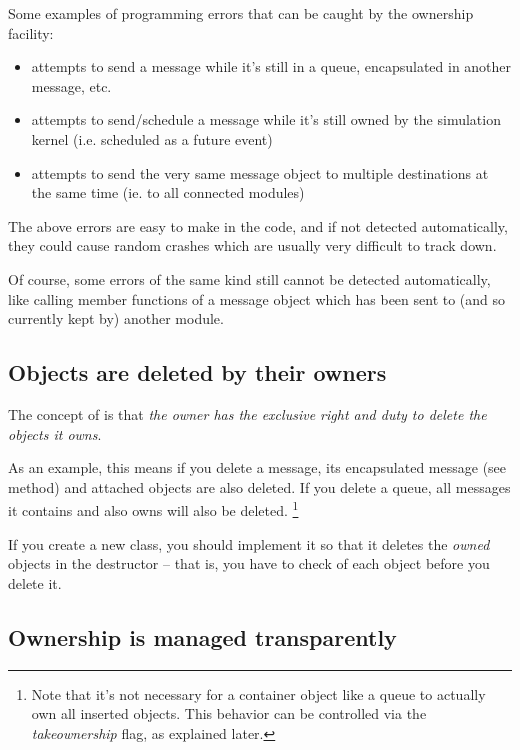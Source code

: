 Some examples of programming errors that can be caught
by the ownership facility:

\begin{itemize}
    \item{attempts to send a message while it's still in a queue,
    encapsulated in another message, etc.}

    \item{attempts to send/schedule a message while it's still owned
    by the simulation kernel (i.e. scheduled as a future event)}

    \item{attempts to send the very same message object to multiple
    destinations at the same time (ie. to all connected modules)}
\end{itemize}

The above errors are easy to make in the code, and if not
detected automatically, they could cause random crashes
which are usually very difficult to track down.

Of course, some errors of the same kind still cannot be detected
automatically, like calling member functions of a message object
which has been sent to (and so currently kept by) another module.


\subsection{Objects are deleted by their owners}

The concept of  is that \textit{the owner has the
exclusive right and duty to delete the objects it owns}.

As an example, this means if you delete a message, its encapsulated
message (see  method) and attached
 objects are also deleted. If you delete a queue,
all messages it contains and also owns will also be deleted.
  \footnote{Note that it's not necessary for a container object like
  a queue to actually own all inserted objects. This behavior
  can be controlled via the \textit{takeownership} flag,
  as explained later.}

If you create a new class, you should implement it so that
it deletes the \textit{owned} objects in the destructor --
that is, you have to check  of each object
before you delete it.


\subsection{Ownership is managed transparently}

